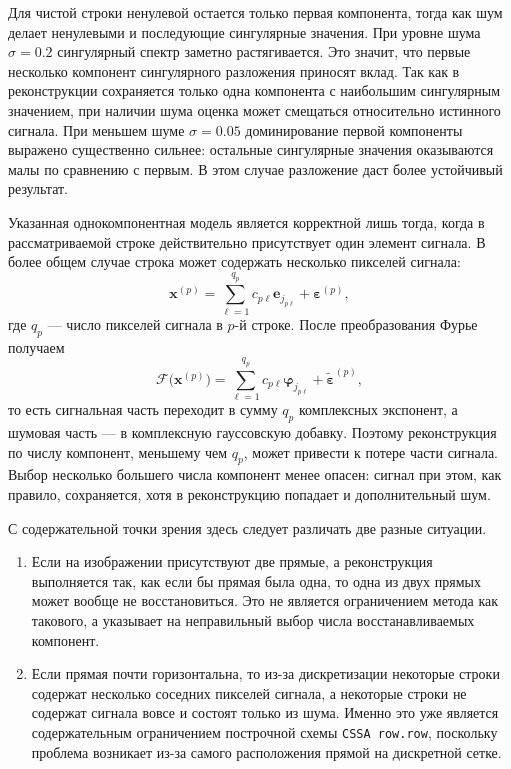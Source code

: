 Для чистой строки ненулевой остается только первая компонента, тогда как шум делает ненулевыми и последующие сингулярные значения. При уровне шума $\sigma=0.2$ сингулярный спектр заметно растягивается. Это значит, что первые несколько компонент сингулярного разложения приносят вклад. Так как в реконструкции сохраняется только одна компонента с наибольшим сингулярным значением, при наличии шума оценка может смещаться относительно истинного сигнала. При меньшем шуме $\sigma=0.05$ доминирование первой компоненты выражено существенно сильнее: остальные сингулярные значения оказываются малы по сравнению с первым. В этом случае разложение даст более устойчивый результат.

Указанная однокомпонентная модель является корректной лишь тогда, когда в рассматриваемой строке действительно присутствует один элемент сигнала. В более общем случае строка может содержать несколько пикселей сигнала:
\[
\mathbf{x}^{(p)} = \sum_{\ell=1}^{q_p} c_{p\ell}\mathbf{e}_{j_{p\ell}} + \boldsymbol{\varepsilon}^{(p)},
\]
где $q_p$ --- число пикселей сигнала в $p$-й строке. После преобразования Фурье
получаем
\[
\mathcal{F}\bigl(\mathbf{x}^{(p)}\bigr)
=
\sum_{\ell=1}^{q_p} c_{p\ell}\boldsymbol{\varphi}_{j_{p\ell}}
+
\widetilde{\boldsymbol{\varepsilon}}^{(p)},
\]
то есть сигнальная часть переходит в сумму $q_p$ комплексных экспонент, а
шумовая часть --- в комплексную гауссовскую добавку. Поэтому реконструкция по
числу компонент, меньшему чем $q_p$, может привести к потере части сигнала.
Выбор несколько большего числа компонент менее опасен: сигнал при этом, как
правило, сохраняется, хотя в реконструкцию попадает и дополнительный шум.

С содержательной точки зрения здесь следует различать две разные ситуации.
\begin{enumerate}
	\item Если на изображении присутствуют две прямые, а реконструкция выполняется так, как если бы прямая была одна, то одна из двух прямых может вообще не восстановиться. Это не является ограничением метода как такового, а указывает на неправильный выбор числа восстанавливаемых компонент.
	\item Если прямая почти горизонтальна, то из-за дискретизации некоторые строки содержат несколько соседних пикселей сигнала, а некоторые строки не содержат сигнала вовсе и состоят только из шума. Именно это уже является содержательным ограничением построчной схемы \texttt{CSSA row.row}, поскольку проблема возникает из-за самого расположения прямой на дискретной сетке.
\end{enumerate}

